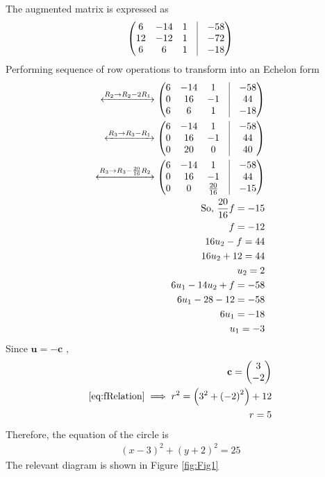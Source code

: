 \documentclass[12pt]{article}
\providecommand{\brak}[1]{\ensuremath{\left(#1\right)}}
\newcommand{\myvec}[1]{\ensuremath{\begin{pmatrix}#1\end{pmatrix}}}
\let\vec\mathbf
\begin{document}
\begin{enumerate}
The augmented matrix is expressed as
\begin{align}
	\myvec{6 & -14 & 1 & \vrule & -58 \\ 
	      12 & -12 & 1 & \vrule & -72 \\
	       6 &  6  & 1 & \vrule & -18 
	     }  
\end{align}
Performing sequence of row operations to transform into an Echelon form
\begin{align}
	\xleftrightarrow[]{{R_2\rightarrow R_2-2R_1}}  
	\myvec{6 & -14 & 1 & \vrule & -58 \\ 
	       0 &  16 & -1 & \vrule & 44 \\
	       6 &  6  & 1 & \vrule & -18 
	     }  \\ 
	\xleftrightarrow[]{{R_3\rightarrow R_3-R_1}}  
	\myvec{6 & -14 & 1 & \vrule & -58 \\ 
	       0 &  16 & -1 & \vrule & 44 \\
	       0 &  20  & 0 & \vrule & 40 
	     }  \\ 
	\xleftrightarrow[]{{R_3\rightarrow R_3-\frac{20}{16}R_2}}  
	\myvec{6 & -14 & 1 & \vrule & -58 \\ 
	       0 &  16 & -1 & \vrule & 44 \\
	       0 &  0  &  \frac{20}{16} & \vrule & -15 
	     }  \\ 
	\text{So, } \frac{20}{16}f = -15 \\
	f = -12 \\
	16u_2- f = 44 \\
	16u_2 +12 = 44 \\
	u_2 = 2 \\
	6u_1 -14u_2 + f = -58 \\
	6u_1 - 28 -12 = -58 \\
	6u_1 = -18 \\
	u_1 = -3
\end{align}
Since $\vec{u} = -\vec{c}$ , 
\begin{align}
 \vec{c} = \myvec{ 3 \\ -2} \\
	\eqref{eq:fRelation} \implies r^2 = \brak{3^2 + \brak{-2}^2} + 12 \\
         r = 5
\end{align}
Therefore, the equation of the circle is 
\begin{align}
	\brak{x-3}^2 + \brak{y+2}^2 = 25
\end{align}
The relevant diagram is shown in Figure \ref{fig:Fig1}
\begin{figure}[!h]
	\begin{center}

\end{center}
\end{figure}
\end{enumerate}
\end{document}
